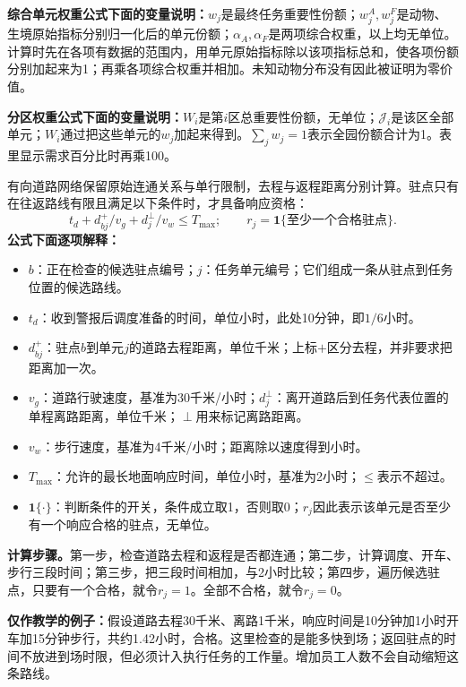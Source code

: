 \documentclass[12pt,a4paper]{article}
\numberwithin{equation}{section}
\begin{document}
\noindent\textbf{综合单元权重公式下面的变量说明：}$w_j$是最终任务重要性份额；$w_j^A,w_j^F$是动物、生境原始指标分别归一化后的单元份额；$\alpha_A,\alpha_F$是两项综合权重，以上均无单位。计算时先在各项有数据的范围内，用单元原始指标除以该项指标总和，使各项份额分别加起来为1；再乘各项综合权重并相加。未知动物分布没有因此被证明为零价值。

\noindent\textbf{分区权重公式下面的变量说明：}$W_i$是第$i$区总重要性份额，无单位；$\mathcal J_i$是该区全部单元；$W_i$通过把这些单元的$w_j$加起来得到。$\sum_j w_j=1$表示全园份额合计为1。表里显示需求百分比时再乘100。


有向道路网络保留原始连通关系与单行限制，去程与返程距离分别计算。驻点只有在往返路线有限且满足以下条件时，才具备响应资格：
\begin{equation}
t_d+d_{bj}^+/v_g+d_j^\perp/v_w\le T_{\max};\qquad
r_j=\mathbf1\{\text{至少一个合格驻点}\}.
\label{eq:response}
\end{equation}
\noindent\textbf{公式下面逐项解释：}
\begin{itemize}
\item $b$：正在检查的候选驻点编号；$j$：任务单元编号；它们组成一条从驻点到任务位置的候选路线。
\item $t_d$：收到警报后调度准备的时间，单位小时，此处10分钟，即$1/6$小时。
\item $d_{bj}^{+}$：驻点$b$到单元$j$的道路去程距离，单位千米；上标$+$区分去程，并非要求把距离加一次。
\item $v_g$：道路行驶速度，基准为30千米/小时；$d_j^{\perp}$：离开道路后到任务代表位置的单程离路距离，单位千米；$\perp$用来标记离路距离。
\item $v_w$：步行速度，基准为4千米/小时；距离除以速度得到小时。
\item $T_{\max}$：允许的最长地面响应时间，单位小时，基准为2小时；$\le$表示不超过。
\item $\mathbf1\{\cdot\}$：判断条件的开关，条件成立取1，否则取0；$r_j$因此表示该单元是否至少有一个响应合格的驻点，无单位。
\end{itemize}
\noindent\textbf{计算步骤。}第一步，检查道路去程和返程是否都连通；第二步，计算调度、开车、步行三段时间；第三步，把三段时间相加，与2小时比较；第四步，遍历候选驻点，只要有一个合格，就令$r_j=1$。全部不合格，就令$r_j=0$。

\noindent\textbf{仅作教学的例子：}假设道路去程30千米、离路1千米，响应时间是10分钟加1小时开车加15分钟步行，共约1.42小时，合格。这里检查的是能多快到场；返回驻点的时间不放进到场时限，但必须计入执行任务的工作量。增加员工人数不会自动缩短这条路线。
\end{document}
